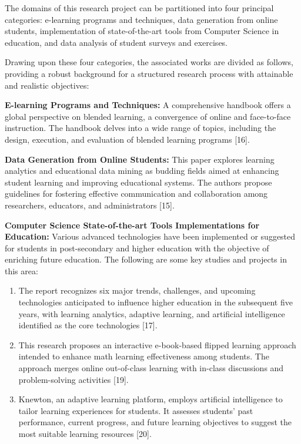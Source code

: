 The domains of this research project can be partitioned into four principal categories: e-learning programs and techniques, data generation from online students, implementation of state-of-the-art tools from Computer Science in education, and data analysis of student surveys and exercises.

Drawing upon these four categories, the associated works are divided as follows, providing a robust background for a structured research process with attainable and realistic objectives:

\textbf{E-learning Programs and Techniques:}
A comprehensive handbook offers a global perspective on blended learning, a convergence of online and face-to-face instruction. The handbook delves into a wide range of topics, including the design, execution, and evaluation of blended learning programs [16].

\textbf{Data Generation from Online Students:}
This paper explores learning analytics and educational data mining as budding fields aimed at enhancing student learning and improving educational systems. The authors propose guidelines for fostering effective communication and collaboration among researchers, educators, and administrators [15].

\textbf{Computer Science State-of-the-art Tools Implementations for Education:}
Various advanced technologies have been implemented or suggested for students in post-secondary and higher education with the objective of enriching future education. The following are some key studies and projects in this area:

\begin{enumerate}
    \item The report recognizes six major trends, challenges, and upcoming technologies anticipated to influence higher education in the subsequent five years, with learning analytics, adaptive learning, and artificial intelligence identified as the core technologies [17].
    \item This research proposes an interactive e-book-based flipped learning approach intended to enhance math learning effectiveness among students. The approach merges online out-of-class learning with in-class discussions and problem-solving activities [19].
    \item Knewton, an adaptive learning platform, employs artificial intelligence to tailor learning experiences for students. It assesses students' past performance, current progress, and future learning objectives to suggest the most suitable learning resources [20].
\end{enumerate}



